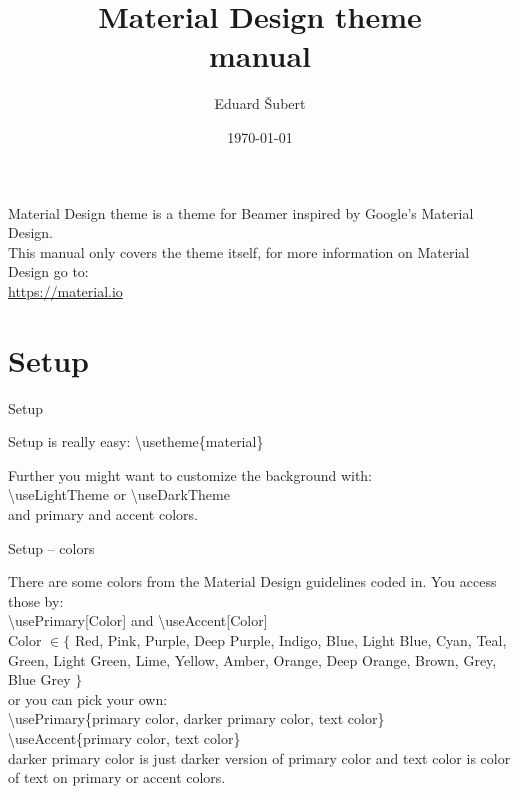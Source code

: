 \documentclass[aspectratio=43]{beamer}
\title{Material Design theme \\manual}
\date{\today}
\author[Šubert]{Eduard Šubert}
\begin{document}
\begin{frame}
\titlepage
\end{frame}

\begin{frame}
\begin{card}
Material Design theme is a theme for Beamer inspired by Google's Material Design. \\[5mm]
This manual only covers the theme itself, for more information on Material Design go to: 
\\\url{https://material.io}
\end{card}
\end{frame}

\section{Setup}
\begin{frame}{Setup}
\begin{card}
Setup is really easy: 
{\color{primary}\textbackslash usetheme\{material\}}
\end{card}
\begin{card}
Further you might want to customize the background with: \\[2mm]
{\color{primary}\textbackslash useLightTheme} or {\color{primary}\textbackslash useDarkTheme} \\[2mm]
and primary and accent colors.
\end{card}
\end{frame}

\begin{frame}{Setup -- colors}
\begin{card}
There are some colors from the Material Design guidelines coded in. You access those by: \\[2mm]
{\color{primary} \textbackslash usePrimary[Color]} and {\color{primary}\textbackslash useAccent[Color]}\\[2mm]
{\tiny {\color{primary}Color} $\in \{$ Red, Pink, Purple, Deep Purple, Indigo, Blue, Light Blue, Cyan, Teal, Green, Light Green, Lime, Yellow, Amber, Orange, Deep Orange, Brown, Grey, Blue Grey $\}$} \\[2mm]
or you can pick your own:\\[2mm]
{\color{primary} \textbackslash usePrimary\{primary color, darker primary color, text color\}}
{\color{primary} \textbackslash useAccent\{primary color, text color\}}\\[2mm]
{\color{primary} darker primary color} is just darker version of {\color{primary} primary color} and {\color{primary} text color} is color of text on {\color{primary} primary} or {\color{primary} accent colors}.
\end{card}
\end{frame}
\end{document}
